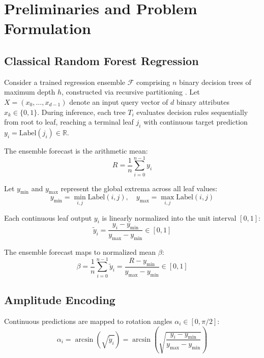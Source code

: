 \documentclass[sn-mathphys,Numbered]{sn-jnl}
\theoremstyle{thmstyleone}
\theoremstyle{thmstyletwo}
\theoremstyle{thmstylethree}
\begin{document}
\section{Preliminaries and Problem Formulation}\label{sec3}

\subsection{Classical Random Forest Regression}\label{subsec3.1}

Consider a trained regression ensemble $\mathcal{F}$ comprising $n$ binary decision trees of maximum depth $h$, constructed via recursive partitioning \cite{quinlan1986induction}. Let $X = (x_0, \dots, x_{d-1})$ denote an input query vector of $d$ binary attributes $x_k \in \{0, 1\}$. During inference, each tree $T_i$ evaluates decision rules sequentially from root to leaf, reaching a terminal leaf $j_i$ with continuous target prediction $y_i = \text{Label}(j_i) \in \mathbb{R}$.

The ensemble forecast is the arithmetic mean:
\begin{equation}\label{eq2}
R = \frac{1}{n} \sum_{i=0}^{n-1} y_i
\end{equation}

Let $y_{\min}$ and $y_{\max}$ represent the global extrema across all leaf values:
\begin{equation}\label{eq3}
y_{\min} = \min_{i,j} \text{Label}(i, j), \quad y_{\max} = \max_{i,j} \text{Label}(i, j)
\end{equation}

Each continuous leaf output $y_i$ is linearly normalized into the unit interval $[0, 1]$:
\begin{equation}\label{eq4}
\tilde{y}_i = \frac{y_i - y_{\min}}{y_{\max} - y_{\min}} \in [0, 1]
\end{equation}

The ensemble forecast maps to normalized mean $\beta$:
\begin{equation}\label{eq5}
\beta = \frac{1}{n} \sum_{i=0}^{n-1} \tilde{y}_i = \frac{R - y_{\min}}{y_{\max} - y_{\min}} \in [0, 1]
\end{equation}

\subsection{Amplitude Encoding}\label{subsec3.2}

Continuous predictions are mapped to rotation angles $\alpha_i \in [0, \pi/2]$:
\begin{equation}\label{eq6}
\alpha_i = \arcsin\left(\sqrt{\tilde{y}_i}\right) = \arcsin\left(\sqrt{\frac{y_i - y_{\min}}{y_{\max} - y_{\min}}}\right)
\end{equation}
\end{document}
